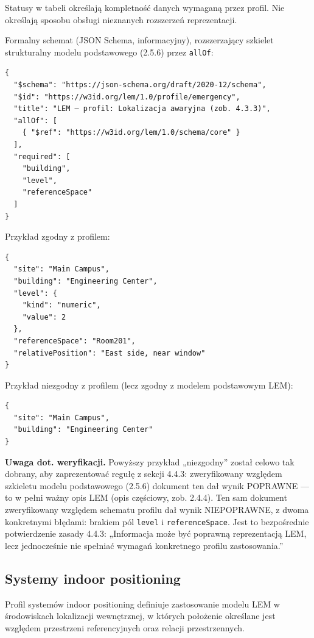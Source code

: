 Statusy w tabeli określają kompletność danych wymaganą przez profil. Nie określają sposobu obsługi nieznanych rozszerzeń reprezentacji.

Formalny schemat (JSON Schema, informacyjny), rozszerzający szkielet strukturalny modelu podstawowego (2.5.6) przez \texttt{allOf}:

\begin{verbatim}
{
  "$schema": "https://json-schema.org/draft/2020-12/schema",
  "$id": "https://w3id.org/lem/1.0/profile/emergency",
  "title": "LEM — profil: Lokalizacja awaryjna (zob. 4.3.3)",
  "allOf": [
    { "$ref": "https://w3id.org/lem/1.0/schema/core" }
  ],
  "required": [
    "building",
    "level",
    "referenceSpace"
  ]
}
\end{verbatim}

Przykład zgodny z profilem:
\begin{verbatim}
{
  "site": "Main Campus",
  "building": "Engineering Center",
  "level": {
    "kind": "numeric",
    "value": 2
  },
  "referenceSpace": "Room201",
  "relativePosition": "East side, near window"
}
\end{verbatim}

Przykład niezgodny z profilem (lecz zgodny z modelem podstawowym LEM):
\begin{verbatim}
{
  "site": "Main Campus",
  "building": "Engineering Center"
}
\end{verbatim}

\textbf{Uwaga dot. weryfikacji.} Powyższy przykład „niezgodny” został celowo tak dobrany, aby zaprezentować regułę z sekcji 4.4.3: zweryfikowany względem szkieletu modelu podstawowego (2.5.6) dokument ten dał wynik POPRAWNE — to w pełni ważny opis LEM (opis częściowy, zob. 2.4.4). Ten sam dokument zweryfikowany względem schematu profilu dał wynik NIEPOPRAWNE, z dwoma konkretnymi błędami: brakiem pól \texttt{level} i \texttt{referenceSpace}. Jest to bezpośrednie potwierdzenie zasady 4.4.3: „Informacja może być poprawną reprezentacją LEM, lecz jednocześnie nie spełniać wymagań konkretnego profilu zastosowania.”

\subsection{Systemy indoor positioning}
Profil systemów indoor positioning definiuje zastosowanie modelu LEM w środowiskach lokalizacji wewnętrznej, w których położenie określane jest względem przestrzeni referencyjnych oraz relacji przestrzennych.

